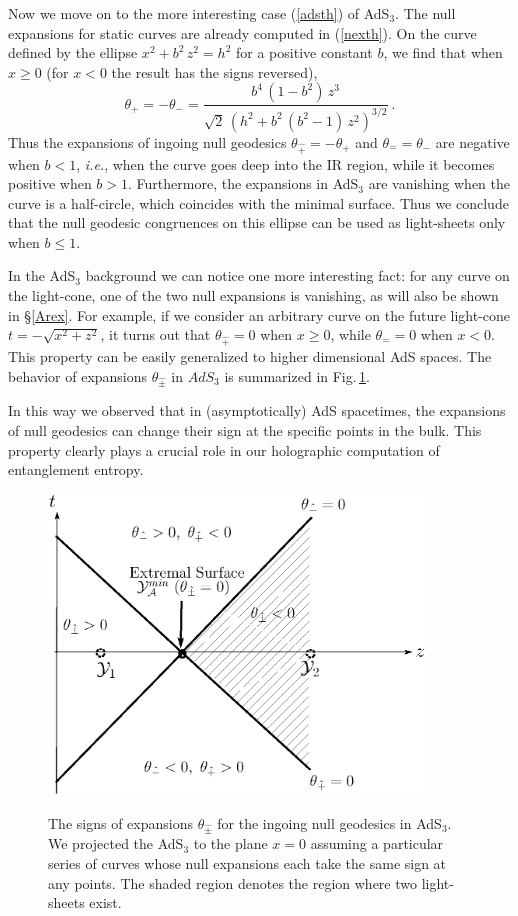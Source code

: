 \documentclass[12pt]{article}
\newcommand{\be}{\begin{equation}}
\newcommand{\ee}{\end{equation}}
\def\sec#1{\S \;\ref{#1}}
\def\fig#1{Fig.\,\ref{#1}}
\def\req#1{(\ref{#1})}
\def\({\left (}
\def\){\right )}
\def\ie{{\it i.e.}}
\def\s{\sigma}
\def\f#1#2{{\frac{#1}{#2}}}
\def\f#1#2{{\frac{#1}{#2}}}
\def\ads#1{AdS$_{#1}$}
\def\s{\sqrt}
\def\f {\frac}
\begin{document}
Now we move on to the more interesting case  \req{adsth} of AdS$_3$.
The null expansions for static curves are already computed in
\req{nexth}. On the curve defined by the ellipse $x^2+b^2\, z^2=h^2$
for a positive constant $b$, we find that when $x\geq 0$ (for $x<0$
the result has the signs reversed),
%
\be \theta_+=-\theta_-= \f{b^4 \, (1-b^2)\, z^3}{\s{2}\, \(h^2+b^2\,
(b^2-1)\, z^2\)^{3/2}}\ . \ee
%
Thus the expansions of ingoing null geodesics
$\theta_{\hat{+}}=-\theta_+$ and $\theta_{\hat{-}}=\theta_-$ are
negative when $b<1 $, \ie, when the curve goes deep into the IR
region, while it becomes positive when $b>1$. Furthermore, the
expansions in AdS$_3$ are vanishing when the curve is a half-circle,
which coincides with the minimal surface. Thus we conclude that the
null geodesic congruences on this ellipse can be used as
light-sheets only when $b\leq 1$.

In the \ads{3} background we can notice one more interesting fact:
for any curve on the light-cone, one of the two null expansions is
vanishing, as will also be shown in \sec{Arex}. For example, if we
consider an arbitrary curve on the future light-cone
$t=-\s{x^2+z^2}$, it turns out that $\theta_{\hat{+}}=0$ when $x\geq
0$, while $\theta_{\hat{-}}=0$ when $x<0$. This property can be
easily generalized to higher dimensional AdS spaces. The behavior of
expansions $\theta_{\hat{\pm}}$ in $AdS_3$ is summarized in
\fig{lightsheetst}. 

In this way we observed that in (asymptotically) AdS spacetimes, the
expansions of null geodesics can change their sign at the specific
points in the bulk.  This property clearly plays a crucial
role in our holographic computation of entanglement entropy.
\begin{figure}
\begin{center}
  \includegraphics[width=10cm]{lightex}\\
  \caption{The signs of expansions $\theta_{\hat{\pm}}$
  for the ingoing null geodesics in \ads{3}.
  We projected the \ads{3} to the plane $x=0$ assuming a
particular series of curves whose
   null expansions each take the same sign at any points. The shaded region denotes the region where
   two light-sheets exist.} \label{lightsheetst}
\end{center}
\end{figure}
\end{document}

